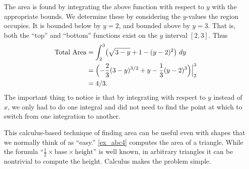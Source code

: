 \begin{example}
The area is found by integrating the above function with respect to $y$ with the appropriate bounds. We determine these by considering the $y$-values the region occupies. It is bounded below by $y=2$, and bounded above by $y=3$. That is, both the ``top'' and ``bottom'' functions exist on the $y$ interval $[2,3]$. Thus
\begin{align*}
	\text{Total Area}
	&= \int_2^3 \bigl(\sqrt{3-y}+1 - (y-2)^2\bigr)\ dy \\
	&= \Bigl(-\frac23(3-y)^{3/2}+y-\frac13(y-2)^3\Bigr)\Big|_2^3 \\
	&= 4/3.
\end{align*}
The important thing to notice is that by integrating with respect to $y$ instead of $x$, we only had to do one integral and did not need to find the point at which to switch from one integration to another.
\end{example}

This calculus-based technique of finding area can be useful even with shapes that we normally think of as ``easy.'' \autoref{ex_abc4} computes the area of a triangle. While the formula ``$\frac12\times\text{base}\times\text{height}$'' is well known, in arbitrary triangles it can be nontrivial to compute the height. Calculus makes the problem simple.

